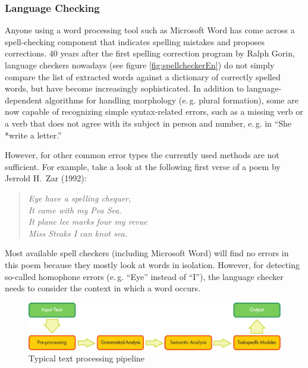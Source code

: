 \begin{multicols}{2}
\subsubsection{Language Checking}
Anyone using a word processing tool such as Microsoft Word has come
across a spell-checking component that indicates spelling mistakes and
proposes corrections. 40 years after the first spelling correction
program by Ralph Gorin, language checkers nowadays (see figure
\ref{fig:spellcheckerEn}) do not simply compare the list of extracted
words against a dictionary of correctly spelled words, but have become
increasingly sophisticated. In addition to language-dependent
algorithms for handling morphology (e.\,g. plural formation), some are
now capable of recognizing simple syntax-related errors, such as a
missing verb or a verb that does not agree with its subject in person
and number, e.\,g. in ``She *write a letter.''

However, for other common error types the currently used methods are
not sufficient. For example, take a look at the following first verse
of a poem by Jerrold H.~Zar (1992):
\begin{quote}
{\em Eye have a spelling chequer,\\
It came with my Pea Sea.\\
It plane lee marks four my revue\\
Miss Steaks I can knot sea.}
\end{quote}
Most available spell checkers (including Microsoft Word) will find
no errors in this poem because they mostly look at words in
isolation. However, for detecting so-called homophone errors
(e.\,g. ``Eye'' instead of ``I''), the language checker needs to consider
the context in which a word occurs.

\begin{figure}[htb]
\begin{center}
 \includegraphics[width=\textwidth]{../_media/english/text_processing_app_architecture}
\caption{Typical text processing pipeline}
\label{fig:textprocarchiEng}
\end{center}
\end{figure}


\end{multicols}
